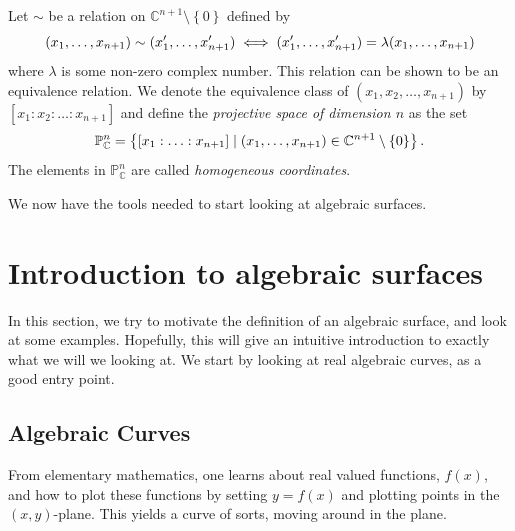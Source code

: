 \documentclass{article}
\newcommand{\C}{\ensuremath{\mathbb{C}}}
\renewcommand{\P}{\ensuremath{\mathbb{P}}}
\begin{document}
    \begin{definition}
        Let $\sim$ be a relation on $\C^{n+1}\setminus \left\{ 0 \right\}$ defined by
        \begin{equation}
            \notag
            (x_1, \ldots, x_{n+1}) \sim (x_1', \ldots, x_{n+1}')
            \iff (x_1', \ldots, x_{n+1}') = \lambda(x_1, \ldots,
            x_{n+1})
        \end{equation}
        where $\lambda$ is some non-zero complex number. This relation can be
        shown to be an equivalence relation. We denote the
        equivalence class of $(x_1, x_2, \ldots, x_{n+1})$ by $\left[ x_1 : x_2
        : \ldots : x_{n+1} \right]$ and define the \emph{projective space of
        dimension $n$} as the set 
        \begin{equation}
            \notag
            \P^{n}_\C = \left\{ \left[ x_1 : \ldots : x_{n+1} \right] \mid (x_1,
            \ldots , x_{n+1}) \in \C^{n+1}\setminus \left\{ 0 \right\}\right\}.
        \end{equation}
        The elements in $\P_\C^n$ are called \emph{homogeneous
        coordinates}. 
    \end{definition}


    We now have the tools needed to start looking at algebraic surfaces.
    
    \section{Introduction to algebraic surfaces}
    
    In this section, we try to motivate the definition of an algebraic surface,
    and look at some examples. Hopefully, this will give an intuitive
    introduction to exactly what we will we looking at. We start by looking at
    real algebraic curves, as a good entry point.

    \subsection{Algebraic Curves}
    \label{sub:algebraic_curves}
    
    From elementary mathematics, one learns about real valued functions,
    $f(x)$, and how to plot these functions by setting $y = f(x)$ and plotting
    points in the $(x, y)$-plane. This yields a curve of sorts, moving around
    in the plane.
\end{document}
